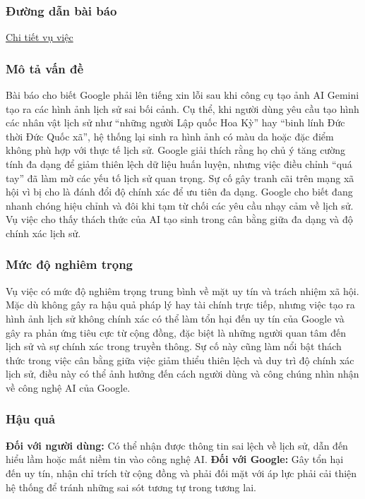 \subsubsection{Đường dẫn bài báo}
\href{https://www.theverge.com/2024/2/21/24079371/google-ai-gemini-generative-inaccurate-historical}{Chi tiết vụ việc}

\subsubsection{Mô tả vấn đề}
Bài báo cho biết Google phải lên tiếng xin lỗi sau khi công cụ tạo ảnh AI Gemini tạo ra các hình ảnh lịch sử sai bối cảnh. Cụ thể, khi người dùng yêu cầu tạo hình các nhân vật lịch sử như “những người Lập quốc Hoa Kỳ” hay “binh lính Đức thời Đức Quốc xã”, hệ thống lại sinh ra hình ảnh có màu da hoặc đặc điểm không phù hợp với thực tế lịch sử. Google giải thích rằng họ chủ ý tăng cường tính đa dạng để giảm thiên lệch dữ liệu huấn luyện, nhưng việc điều chỉnh “quá tay” đã làm mờ các yếu tố lịch sử quan trọng. Sự cố gây tranh cãi trên mạng xã hội vì bị cho là đánh đổi độ chính xác để ưu tiên đa dạng. Google cho biết đang nhanh chóng hiệu chỉnh và đôi khi tạm từ chối các yêu cầu nhạy cảm về lịch sử. Vụ việc cho thấy thách thức của AI tạo sinh trong cân bằng giữa đa dạng và độ chính xác lịch sử.

\subsubsection{Mức độ nghiêm trọng}
Vụ việc có mức độ nghiêm trọng trung bình về mặt uy tín và trách nhiệm xã hội. Mặc dù không gây ra hậu quả pháp lý hay tài chính trực tiếp, nhưng việc tạo ra hình ảnh lịch sử không chính xác có thể làm tổn hại đến uy tín của Google và gây ra phản ứng tiêu cực từ cộng đồng, đặc biệt là những người quan tâm đến lịch sử và sự chính xác trong truyền thông. Sự cố này cũng làm nổi bật thách thức trong việc cân bằng giữa việc giảm thiểu thiên lệch và duy trì độ chính xác lịch sử, điều này có thể ảnh hưởng đến cách người dùng và công chúng nhìn nhận về công nghệ AI của Google.

\subsubsection{Hậu quả}
\textbf{Đối với người dùng:} Có thể nhận được thông tin sai lệch về lịch sử, dẫn đến hiểu lầm hoặc mất niềm tin vào công nghệ AI.
\textbf{Đối với Google:} Gây tổn hại đến uy tín, nhận chỉ trích từ cộng đồng và phải đối mặt với áp lực phải cải thiện hệ thống để tránh những sai sót tương tự trong tương lai.

